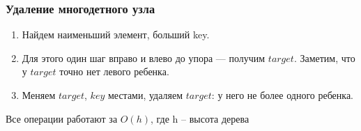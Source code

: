 \subsubsection*{Удаление многодетного узла}

\Alg

\begin{enumerate}
    \item Найдем наименьший элемент, больший key.
    \item Для этого один шаг вправо и влево до упора — получим $target$. Заметим, что у $target$ точно нет левого ребенка.
    \item Меняем $target$, $key$ местами, удаляем $target$: у него не более одного ребенка.
\end{enumerate}

\Statement Все операции работают за $O(h)$, где h -- высота дерева

\pagebreak